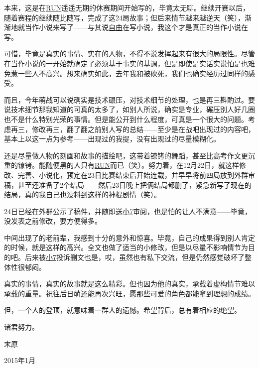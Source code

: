 本来，这是在\uline{RUN}遥遥无期的休赛期间开始写的，毕竟太无聊。继续开赛以后，随着赛程的继续随比随写，完成了这24局故事；但后来情节越来越逆天（笑），渐渐地就当作小说来写了——与其说\uline{自由}在写小说，我这个才是真正的当作小说在写。

可惜，毕竟是真实的事情、实在的人物，不得不说发挥起来有很大的局限性。尽管在当作小说的一开始就确定了必须基于事实的基调，但是即使是实话实说怕是也难免惹一些人不高兴。想来确实如此，去年我\uline{和}被砍死，我们也确实经历过同样的感受。

而且，今年萌战可以说确实是技术碾压，对技术细节的处理，也是再三斟酌过。要说技术细节那我知道的可真的太多了，如别人所说，确实是专业，碾压别人好几圈也不是什么特别光荣的事情。但是能公开到什么程度，可真是一个很大的问题。考虑再三，修改再三，翻了翻之前别人写的总结——至少是在战吧出现过的内容吧，基本上以这一点为参考——出现过的我提，没有出现过的尽量模糊化。

还是尽量做人物的刻画和故事的描绘吧，这带着镣铐的舞蹈，甚至比高考作文更沉重的镣铐。能随便黑的人只有\uline{RUN}而已（笑）。努力着，在12月22日，就这样修改、完善、小说化，预定在23日比赛结束后开始连载，并早早将前四局放到外群审稿，甚至还准备了2个结局——然后23日晚上把俩结局都删了，紧急新写了现在的结局，真的我自己也没料到这样的神棍剧情（笑）。

24日已经在外群公示了稿件，并随即送\uline{小7}审阅，也是怕的让人不满意——毕竟，没发表之前修改，要方便得多。

中间出现了的老前辈，我感到十分的意外和惊喜。毕竟，自己的成果得到别人肯定的时候，就是这样的高兴。全文也做了适当的小修改，但是以尽量不影响情节为目的吧。后来被\uline{小7}投诉删文也是，哎，虽然也有私下交流，但是仍然感觉破坏了整体性很郁闷。

真实的事情，真实的故事就是这么精彩。但也因为他的真实，承载着虚构情节难以承载的重量。祝往后日萌还能再次兴旺，愿那些可爱的角色都能拿到理想的成绩。

但，一个人的登顶，就意味着一群人的遗憾。希望背后，总有着相应的绝望。

诸君努力。

\begin{flushright}
  \rm\kai 末原

  2015年1月
\end{flushright}
